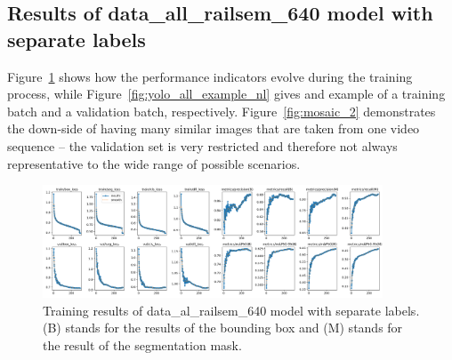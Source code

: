 \documentclass[Master,MDS,english]{BASE/twbook} %
\begin{document}
\subsection{Results of data\_all\_railsem\_640 model with separate labels}

Figure~\ref{fig:training_all_nl} shows how the performance indicators evolve during the training process, while Figure~\ref{fig:yolo_all_example_nl} gives and example of a training batch and a validation batch, respectively.
Figure~\ref{fig:mosaic_2} demonstrates the down-side of having many similar images that are taken from one video sequence -- the validation set is very restricted and therefore not always representative to the wide range of possible scenarios.


\begin{figure}[h]
\centering
\includegraphics[width=0.9\textwidth]{images/yolo/all_nl/results}
\caption{Training results of data\_al\_railsem\_640 model with separate labels. (B) stands for the results of the bounding box and (M) stands for the result of the segmentation mask.}
\label{fig:training_all_nl}
\end{figure}
\end{document}

